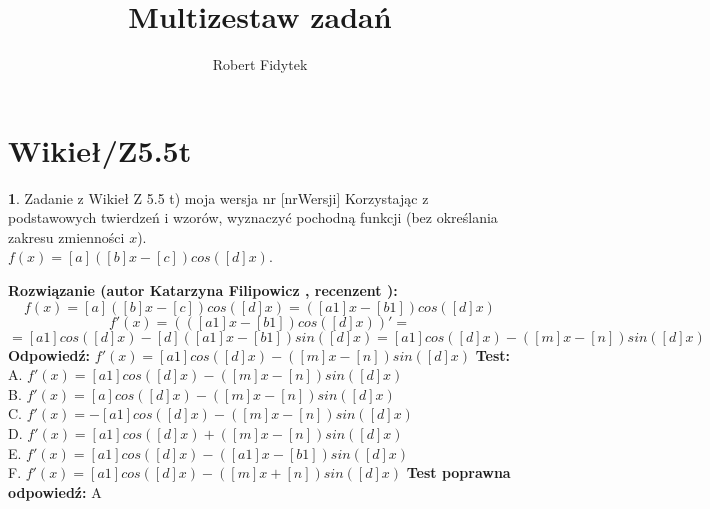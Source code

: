 \documentclass[12pt, a4paper]{article}
\title{Multizestaw zadań}
\author{Robert Fidytek}
\date{}
\theoremstyle{definition} %
\newtheorem{zad}{}
\newcommand{\kategoria}[1]{\section{#1}} %
\newcommand{\zadStart}[1]{\begin{zad}#1\newline} %
\newcommand{\zadStop}{\end{zad}}   %
\newcommand{\rozwStart}[2]{\noindent \textbf{Rozwiązanie (autor #1 , recenzent #2): }\newline} %
\newcommand{\rozwStop}{\newline}                                            %
\newcommand{\odpStart}{\noindent \textbf{Odpowiedź:}\newline}    %
\newcommand{\odpStop}{\newline}                                             %
\newcommand{\testStart}{\noindent \textbf{Test:}\newline} %
\newcommand{\testStop}{\newline} %
\newcommand{\kluczStart}{\noindent \textbf{Test poprawna odpowiedź:}\newline} %
\newcommand{\kluczStop}{\newline} %
\begin{document}
\maketitle


\kategoria{Wikieł/Z5.5t}
\zadStart{Zadanie z Wikieł Z 5.5 t) moja wersja nr [nrWersji]}
Korzystając z podstawowych twierdzeń i wzorów, wyznaczyć pochodną funkcji (bez określania zakresu zmienności $x$).\\ 
$f(x)=[a]([b]x-[c])cos([d]x)$.
\zadStop
\rozwStart{Katarzyna Filipowicz}{}
$$f(x)=[a]([b]x-[c])cos([d]x)=([a1]x-[b1])cos([d]x)$$
$$f'(x)=\left(([a1]x-[b1])cos([d]x)\right)' = $$
$$ = [a1]cos([d]x)-[d]([a1]x-[b1])sin([d]x)=[a1]cos([d]x)-([m]x-[n])sin([d]x)
$$
\rozwStop
\odpStart
$ f'(x)=[a1]cos([d]x)-([m]x-[n])sin([d]x)$
\odpStop
\testStart
A. $ f'(x)=[a1]cos([d]x)-([m]x-[n])sin([d]x)$\\
B. $ f'(x)=[a]cos([d]x)-([m]x-[n])sin([d]x)$\\
C. $ f'(x)=-[a1]cos([d]x)-([m]x-[n])sin([d]x)$ \\
D. $ f'(x)=[a1]cos([d]x)+([m]x-[n])sin([d]x)$\\
E. $ f'(x)=[a1]cos([d]x)-([a1]x-[b1])sin([d]x)$\\
F. $ f'(x)=[a1]cos([d]x)-([m]x+[n])sin([d]x)$
\testStop
\kluczStart
A
\kluczStop
\end{document}
